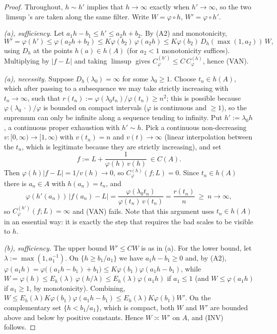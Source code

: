 \documentclass[11pt,a4paper]{article}
\numberwithin{equation}{section}
\theoremstyle{plain}
\theoremstyle{definition}
\theoremstyle{remark}
\begin{document}
\begin{proof}
Throughout, $h\sim h'$ implies that $h\to\infty$ exactly when $h'\to\infty$, so the two
$\limsup$'s are taken along the same filter. Write $W=\varphi\circ h$, $W'=\varphi\circ h'$.

\emph{(a), sufficiency.} Let $a_1h-b_1\le h'\le a_2h+b_2$. By (A2) and monotonicity,
\[
W'=\varphi(h')\le\varphi(a_2h+b_2)\le K\varphi(b_2)\,\varphi(a_2h)
\le K\varphi(b_2)\,D_h(\max(1,a_2))\,W ,
\]
using $D_h$ at the points $h(a)\in h(A)$ (for $a_2<1$ monotonicity suffices). Multiplying
by $|f-L|$ and taking $\limsup$ gives $C^{(h')}_\varphi\le C\,C^{(h)}_\varphi$, hence (VAN).

\emph{(a), necessity.} Suppose $D_h(\lambda_0)=\infty$ for some $\lambda_0\ge1$. Choose
$t_n\in h(A)$, which after passing to a subsequence we may take strictly increasing with
$t_n\to\infty$, such that $r(t_n):=\varphi(\lambda_0t_n)/\varphi(t_n)\ge n^{2}$; this is
possible because $\varphi(\lambda_0\,\cdot)/\varphi$ is bounded on compact intervals
($\varphi$ is continuous and $\ge1$), so the supremum can only be infinite along a sequence
tending to infinity. Put $h':=\lambda_0h$, a continuous proper exhaustion with $h'\sim h$.
Pick a continuous non-decreasing $v:[0,\infty)\to[1,\infty)$ with $v(t_n)=n$ and
$v(t)\to\infty$ (linear interpolation between the $t_n$, which is legitimate because they
are strictly increasing), and set
\[
f:=L+\frac{1}{\varphi(h)\,v(h)}\ \in C(A).
\]
Then $\varphi(h)|f-L|=1/v(h)\to0$, so $C^{(h)}_\varphi(f;L)=0$. Since $t_n\in h(A)$ there
is $a_n\in A$ with $h(a_n)=t_n$, and
\[
\varphi(h'(a_n))\,|f(a_n)-L|=\frac{\varphi(\lambda_0t_n)}{\varphi(t_n)\,v(t_n)}
=\frac{r(t_n)}{n}\ \ge\ n\longrightarrow\infty,
\]
so $C^{(h')}_\varphi(f;L)=\infty$ and (VAN) fails. Note that this argument uses
$t_n\in h(A)$ in an essential way: it is exactly the step that requires the bad scales to
be visible to $h$.

\emph{(b), sufficiency.} The upper bound $W'\le CW$ is as in (a). For the lower bound, let
$\lambda:=\max(1,a_1^{-1})$. On $\{h\ge b_1/a_1\}$ we have $a_1h-b_1\ge0$ and, by (A2),
$\varphi(a_1h)=\varphi\bigl((a_1h-b_1)+b_1\bigr)\le K\varphi(b_1)\varphi(a_1h-b_1)$, while
$W=\varphi(h)\le E_h(\lambda)\,\varphi(h/\lambda)\le E_h(\lambda)\varphi(a_1h)$ if
$a_1\le1$ (and $W\le\varphi(a_1h)$ if $a_1\ge1$, by monotonicity). Combining,
$W\le E_h(\lambda)K\varphi(b_1)\varphi(a_1h-b_1)\le E_h(\lambda)K\varphi(b_1)W'$. On the
complementary set $\{h<b_1/a_1\}$, which is compact, both $W$ and $W'$ are bounded above
and below by positive constants. Hence $W\asymp W'$ on $A$, and (INV) follows.


\end{proof}
\end{document}
